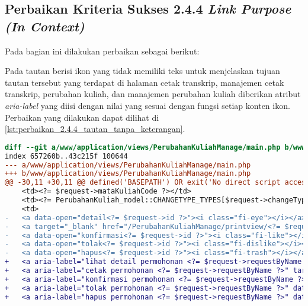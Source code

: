 \subsection{Perbaikan Kriteria Sukses 2.4.4 \textit{Link Purpose (In Context)}}
\label{subsec:perbaikan_kriteria_sukses_2.4.4}
Pada bagian ini dilakukan perbaikan sebagai berikut:

Pada tautan berisi ikon yang tidak memiliki teks untuk menjelaskan tujuan tautan tersebut yang terdapat di halaman cetak transkrip, manajemen cetak transkrip, perubahan kuliah, dan manajemen perubahan kuliah diberikan atribut \textit{aria-label} yang diisi dengan nilai yang sesuai dengan fungsi setiap konten ikon. Perbaikan yang dilakukan dapat dilihat di \ref{lst:perbaikan_2.4.4_tautan_tanpa_keterangan}.
\begin{lstlisting}[frame=single, label={lst:perbaikan_2.4.4_tautan_tanpa_keterangan}, language=diff, caption=Perbaikan Kriteria Sukses 2.4.4 - Tautan Tanpa Keterangan]
diff --git a/www/application/views/PerubahanKuliahManage/main.php b/www/application/views/PerubahanKuliahManage/main.php
index 657260b..43c215f 100644
--- a/www/application/views/PerubahanKuliahManage/main.php
+++ b/www/application/views/PerubahanKuliahManage/main.php
@@ -30,11 +30,11 @@ defined('BASEPATH') OR exit('No direct script access allowed');
    <td><?= $request->mataKuliahCode ?></td>
    <td><?= PerubahanKuliah_model::CHANGETYPE_TYPES[$request->changeType] ?></td>
    <td>
-   <a data-open="detail<?= $request->id ?>"><i class="fi-eye"></i></a>
-   <a target="_blank" href="/PerubahanKuliahManage/printview/<?= $request->id ?>"><i class="fi-print"></i></a>
-   <a data-open="konfirmasi<?= $request->id ?>"><i class="fi-like"></i></a>                                    
-   <a data-open="tolak<?= $request->id ?>"><i class="fi-dislike"></i></a>
-   <a data-open="hapus<?= $request->id ?>"><i class="fi-trash"></i></a>
+   <a aria-label="lihat detail permohonan <?= $request->requestByName ?>" data-open="detail<?= $request->id ?>"><i class="fi-eye"></i></a>
+   <a aria-label="cetak permohonan <?= $request->requestByName ?>" target="_blank" href="/PerubahanKuliahManage/printview/<?= $request->id ?>"><i class="fi-print"></i></a>
+   <a aria-label="konfirmasi permohonan <?= $request->requestByName ?>" data-open="konfirmasi<?= $request->id ?>"><i class="fi-like"></i></a>
+   <a aria-label="tolak permohonan <?= $request->requestByName ?>" data-open="tolak<?= $request->id ?>"><i class="fi-dislike"></i></a>
+   <a aria-label="hapus permohonan <?= $request->requestByName ?>" data-open="hapus<?= $request->id ?>"><i class="fi-trash"></i></a>

\end{lstlisting}
